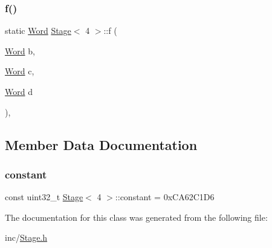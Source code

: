 \subsubsection{\texorpdfstring{f()}{f()}}
{\footnotesize\ttfamily static \mbox{\hyperlink{class_word}{Word}} \mbox{\hyperlink{class_stage}{Stage}}$<$ 4 $>$\+::f (\begin{DoxyParamCaption}\item[{\mbox{\hyperlink{class_word}{Word}}}]{b,  }\item[{\mbox{\hyperlink{class_word}{Word}}}]{c,  }\item[{\mbox{\hyperlink{class_word}{Word}}}]{d }\end{DoxyParamCaption})\hspace{0.3cm}{\ttfamily [inline]}, {\ttfamily [static]}}



\subsection{Member Data Documentation}
\mbox{\label{class_stage_3_014_01_4_aca035db96d832a797eca116a6e5bf9fd}} 
\subsubsection{\texorpdfstring{constant}{constant}}
{\footnotesize\ttfamily const uint32\+\_\+t \mbox{\hyperlink{class_stage}{Stage}}$<$ 4 $>$\+::constant = 0x\+C\+A62\+C1\+D6\hspace{0.3cm}{\ttfamily [static]}}



The documentation for this class was generated from the following file\+:\begin{DoxyCompactItemize}
\item 
inc/\mbox{\hyperlink{_stage_8h}{Stage.\+h}}\end{DoxyCompactItemize}
